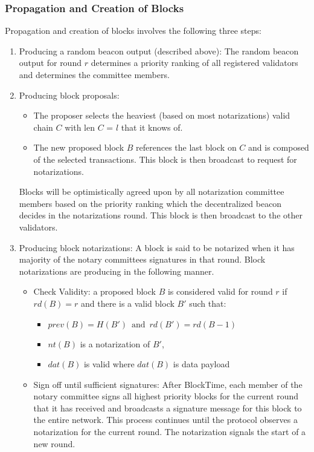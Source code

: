\documentclass[10pt,journal,compsoc]{IEEEtran}
\begin{document}
\subsubsection{Propagation and Creation of Blocks}
Propagation and creation of blocks involves the following three steps: 
\begin{enumerate}
    \item Producing a random beacon output (described above): The random beacon output for round $r$ determines a priority ranking of all registered validators and determines the committee members.
    \item Producing block proposals:
    \begin{itemize}
        \item The proposer selects the heaviest (based on most notarizations) valid chain $C$ with len $C$ = $l$ that it knows of.
        \item The new proposed block $B$ references the last block on $C$ and is composed of the selected transactions. This block is then broadcast to request for notarizations.
    \end{itemize}
    Blocks will be optimistically agreed upon by all notarization committee members based on the priority ranking which the decentralized beacon decides in the notarizations round. This block is then broadcast to the other validators.
    \item Producing block notarizations: A block is said to be notarized when it has majority of the notary committees signatures in that round. Block notarizations are producing in the following manner.
    \begin{itemize}
        \item Check Validity: a proposed block $B$ is considered valid for round $r$ if $rd(B) = r$ and there is a valid block $B'$ such that:
        \begin{itemize}
            \item $prev(B)=H(B') \, \textrm{ and } \, rd(B') = rd(B-1)$
            \item $nt(B)$ is a notarization of $B'$, 
            \item $dat(B)$ is valid where $dat(B)$ is data payload
        \end{itemize}
        \item Sign off until sufficient signatures: After BlockTime, each member of the notary committee signs all highest priority blocks for the current round that it has received and broadcasts a signature message for this block to the entire network. This process continues until the protocol observes a notarization for the current round. The notarization signals the start of a new round.
    \end{itemize}
\end{enumerate}
\end{document}
